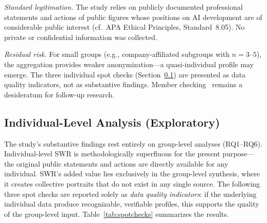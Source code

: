 \documentclass[12pt,a4paper]{article}
\begin{document}
\emph{Standard legitimation.} The study relies on publicly documented professional statements and actions of public figures whose positions on AI development are of considerable public interest (cf.\ APA Ethical Principles, Standard~8.05). No private or confidential information was collected.

\emph{Residual risk.} For small groups (e.g., company-affiliated subgroups with $n = 3\text{--}5$), the aggregation provides weaker anonymization---a quasi-individual profile may emerge. The three individual spot checks (Section~\ref{sec:limitationen:spotchecks}) are presented as data quality indicators, not as substantive findings. Member checking~\citep{SoysalTurkmen2024} remains a desideratum for follow-up research.


\subsection{Individual-Level Analysis (Exploratory)}
\label{sec:limitationen:spotchecks}

The study's substantive findings rest entirely on group-level analyses (RQ1--RQ6). Individual-level SWR is methodologically superfluous for the present purpose---the original public statements and actions are directly available for any individual. SWR's added value lies exclusively in the group-level synthesis, where it creates collective portraits that do not exist in any single source. The following three spot checks are reported solely as \emph{data quality indicators}: if the underlying individual data produce recognizable, verifiable profiles, this supports the quality of the group-level input. Table~\ref{tab:spotchecks} summarizes the results.
\end{document}
